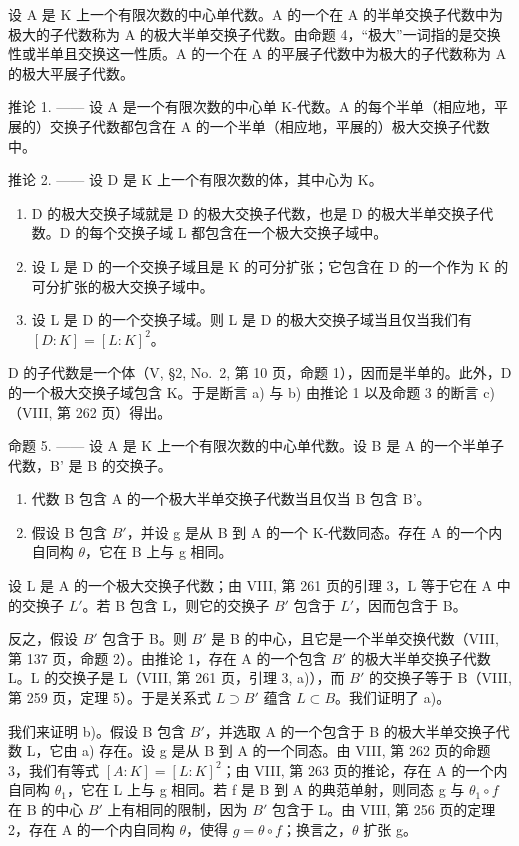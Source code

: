 设 A 是 K 上一个有限次数的中心单代数。A 的一个在 A 的半单交换子代数中为极大的子代数称为 A 的极大半单交换子代数。由命题 4，“极大”一词指的是交换性或半单且交换这一性质。A 的一个在 A 的平展子代数中为极大的子代数称为 A 的极大平展子代数。

推论 1. —— 设 A 是一个有限次数的中心单 K-代数。A 的每个半单（相应地，平展的）交换子代数都包含在 A 的一个半单（相应地，平展的）极大交换子代数中。

推论 2. —— 设 D 是 K 上一个有限次数的体，其中心为 K。

\begin{enumerate}
\def\labelenumi{\alph{enumi})}
\item
  D 的极大交换子域就是 D 的极大交换子代数，也是 D 的极大半单交换子代数。D 的每个交换子域 L 都包含在一个极大交换子域中。
\item
  设 L 是 D 的一个交换子域且是 K 的可分扩张；它包含在 D 的一个作为 K 的可分扩张的极大交换子域中。
\item
  设 L 是 D 的一个交换子域。则 L 是 D 的极大交换子域当且仅当我们有 \([D:K]=[L:K]^{2}\)。
\end{enumerate}

D 的子代数是一个体（V, §2, No.~2, 第 10 页，命题 1），因而是半单的。此外，D 的一个极大交换子域包含 K。于是断言 a) 与 b) 由推论 1 以及命题 3 的断言 c)（VIII, 第 262 页）得出。

命题 5. —— 设 A 是 K 上一个有限次数的中心单代数。设 B 是 A 的一个半单子代数，B' 是 B 的交换子。

\begin{enumerate}
\def\labelenumi{\alph{enumi})}
\item
  代数 B 包含 A 的一个极大半单交换子代数当且仅当 B 包含 B'。
\item
  假设 B 包含 \(B'\)，并设 g 是从 B 到 A 的一个 K-代数同态。存在 A 的一个内自同构 \(\theta\)，它在 B 上与 g 相同。
\end{enumerate}

设 L 是 A 的一个极大交换子代数；由 VIII, 第 261 页的引理 3，L 等于它在 A 中的交换子 \(L'\)。若 B 包含 L，则它的交换子 \(B'\) 包含于 \(L'\)，因而包含于 B。

反之，假设 \(B'\) 包含于 B。则 \(B'\) 是 B 的中心，且它是一个半单交换代数（VIII, 第 137 页，命题 2）。由推论 1，存在 A 的一个包含 \(B'\) 的极大半单交换子代数 L。L 的交换子是 L（VIII, 第 261 页，引理 3, a)），而 \(B'\) 的交换子等于 B（VIII, 第 259 页，定理 5）。于是关系式 \(L \supset B'\) 蕴含 \(L \subset B\)。我们证明了 a)。

我们来证明 b)。假设 B 包含 \(B'\)，并选取 A 的一个包含于 B 的极大半单交换子代数 L，它由 a) 存在。设 g 是从 B 到 A 的一个同态。由 VIII, 第 262 页的命题 3，我们有等式 \([A:K]=[L:K]^{2}\)；由 VIII, 第 263 页的推论，存在 A 的一个内自同构 \(\theta_{1}\)，它在 L 上与 g 相同。若 f 是 B 到 A 的典范单射，则同态 g 与 \(\theta_{1}\circ f\) 在 B 的中心 \(B'\) 上有相同的限制，因为 \(B'\) 包含于 L。由 VIII, 第 256 页的定理 2，存在 A 的一个内自同构 \(\theta\)，使得 \(g=\theta\circ f\)；换言之，\(\theta\) 扩张 g。

